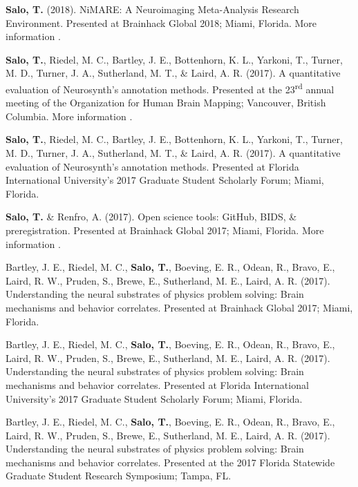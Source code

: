 \documentclass[10pt]{article}
\newcommand{\textlink}[3][blue]{\href{#2}{\color{#1}{#3}}}
\begin{document}
\begin{hangparas}{.25in}{1}
\textbf{Salo, T.} (2018).
NiMARE: A Neuroimaging Meta-Analysis Research Environment.
Presented at Brainhack Global 2018; Miami, Florida. More
information \textlink{https://www.slideshare.net/TaylorSalo/nimarebrainhackglobalmiami}{here}.

\textbf{Salo, T.}, Riedel, M. C., Bartley, J. E., Bottenhorn, K. L., Yarkoni, T.,
Turner, M. D., Turner, J. A., Sutherland, M. T., \& Laird, A. R. (2017).
A quantitative evaluation of Neurosynth's annotation methods. Presented at
the 23\textsuperscript{rd} annual meeting of the Organization for Human Brain
Mapping; Vancouver, British Columbia. More information
\textlink{https://nbclab.github.io/presentations/salo-neurosynth-presentation}{here}.

\bigskip

\textbf{Salo, T.}, Riedel, M. C., Bartley, J. E., Bottenhorn, K. L., Yarkoni, T.,
Turner, M. D., Turner, J. A., Sutherland, M. T., \& Laird, A. R. (2017).
A quantitative evaluation of Neurosynth's annotation methods. Presented at
Florida International University's 2017 Graduate Student Scholarly Forum;
Miami, Florida.

\bigskip

\textbf{Salo, T.} \& Renfro, A. (2017). Open science tools: GitHub, BIDS, \&
preregistration. Presented at Brainhack Global 2017; Miami, Florida. More
information \textlink{https://osf.io/557vf}{here}.

\bigskip

Bartley, J. E., Riedel, M. C., \textbf{Salo, T.}, Boeving, E. R., Odean, R.,
Bravo, E., Laird, R. W., Pruden, S., Brewe, E., Sutherland, M. E., Laird, A. R.
(2017). Understanding the neural substrates of physics problem solving: Brain
mechanisms and behavior correlates. Presented at Brainhack Global 2017; Miami,
Florida.

\bigskip

Bartley, J. E., Riedel, M. C., \textbf{Salo, T.}, Boeving, E. R., Odean, R.,
Bravo, E., Laird, R. W., Pruden, S., Brewe, E., Sutherland, M. E., Laird, A. R.
(2017). Understanding the neural substrates of physics problem solving: Brain
mechanisms and behavior correlates. Presented at Florida International
University's 2017 Graduate Student Scholarly Forum; Miami, Florida.

\bigskip

Bartley, J. E., Riedel, M. C., \textbf{Salo, T.}, Boeving, E. R., Odean, R.,
Bravo, E., Laird, R. W., Pruden, S., Brewe, E., Sutherland, M. E., Laird, A. R.
(2017). Understanding the neural substrates of physics problem solving: Brain
mechanisms and behavior correlates. Presented at the 2017 Florida Statewide
Graduate Student Research Symposium; Tampa, FL.
\end{hangparas}
\end{document}
